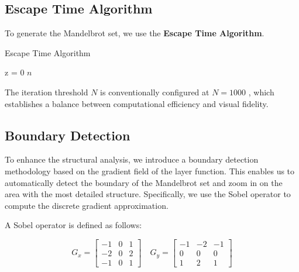 \subsection{Escape Time Algorithm}\label{subsec:escape_time_algorithm}

To generate the Mandelbrot set, we use the \textbf{Escape Time Algorithm}.

\begin{algorithm}[H]
    \SetAlgoLined
    \caption{Escape Time Algorithm}
    \label{alg:escape_time_algorithm}
    z = 0\;
    \Return $n$\;
\end{algorithm}

The iteration threshold $N$ is conventionally configured at $N = 1000$
, which establishes a balance between computational efficiency and visual fidelity.

\subsection{Boundary Detection}\label{subsec:boundary_detection}

To enhance the structural analysis, we introduce a boundary detection methodology based on the gradient field of the
layer function.
This enables us to automatically detect the boundary of the Mandelbrot set and zoom in on the area with the most
detailed structure.
Specifically, we use the Sobel operator\textsuperscript{\cite{sobel1968isotropic}}
to compute the discrete gradient approximation.

A Sobel operator is defined as follows:

\begin{equation}
    \label{eq:sobel_operator}
    G_x = \begin{bmatrix}
              -1 & 0 & 1 \\
              -2 & 0 & 2 \\
              -1 & 0 & 1
    \end{bmatrix}
    \quad
    G_y = \begin{bmatrix}
              -1 & -2 & -1 \\
              0  & 0  & 0  \\
              1  & 2  & 1
    \end{bmatrix}
\end{equation}

